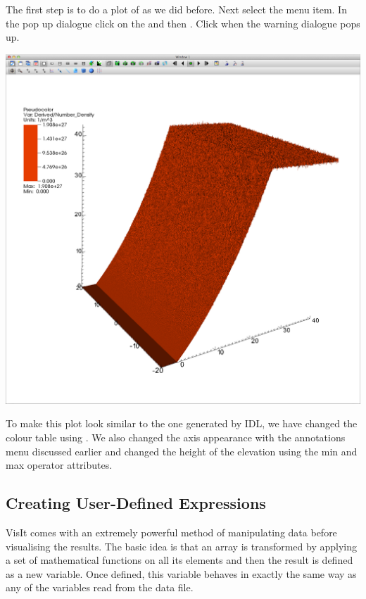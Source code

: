   The first step is to do a  plot of  as
  we did before. Next select the
  menu item.
  In the pop up dialogue click on the  and then . Click  when the warning dialogue pops
  up.
  \begin{center}
    \includegraphics[width=0.8\linewidth]{images/visit_shade_surf}
  \end{center}

  To make this plot look similar to the one generated by IDL, we have changed
  the colour table using .
  We also changed the axis appearance with the annotations menu discussed
  earlier and changed the height of the elevation using the min and max
  operator attributes.

\subsection{Creating User-Defined Expressions}
  VisIt comes with an extremely powerful method of manipulating data before
  visualising the results. The basic idea is that an array is transformed
  by applying a set of mathematical functions on all its elements and then
  the result is defined as a new variable. Once defined, this variable
  behaves in exactly the same way as any of the variables read from the
  data file.

